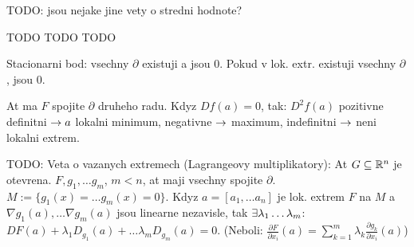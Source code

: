 TODO: jsou nejake jine vety o stredni hodnote?

TODO TODO TODO

Stacionarni bod: vsechny $\partial$ existuji a jsou 0.
Pokud v lok. extr. existuji vsechny $\partial$, jsou 0.

At ma $F$ spojite $\partial$ druheho radu. Kdyz $Df(a)=0$,
tak:
$D^2 f(a)$ pozitivne definitni $\rightarrow a$ lokalni minimum, negativne $\rightarrow$
maximum, indefinitni $\rightarrow$ neni lokalni extrem.

TODO: Veta o vazanych extremech (Lagrangeovy multiplikatory):
At $G\subseteq\mathbb{R}^n$ je otevrena. $F,g_1,\ldots g_m$, $m<n$, at maji vsechny
spojite $\partial$. $M:=\{g_1(x)=\ldots g_m(x)=0\}$.
Kdyz $a=[a_1,\ldots a_n]$ je lok. extrem $F$ na $M$ a $\nabla g_1(a),\ldots
\nabla g_m(a)$ jsou linearne nezavisle, tak $\exists\lambda_1\ldots\lambda_m$:
$DF(a)+\lambda_1 D_{g_1}(a)+\ldots\lambda_m D_{g_m}(a)=0$.
(Neboli: $\frac{\partial F}{\partial x_i}(a)=\sum_{k=1}^m \lambda_k
\frac{\partial g_k}{\partial x_i}(a)$)

